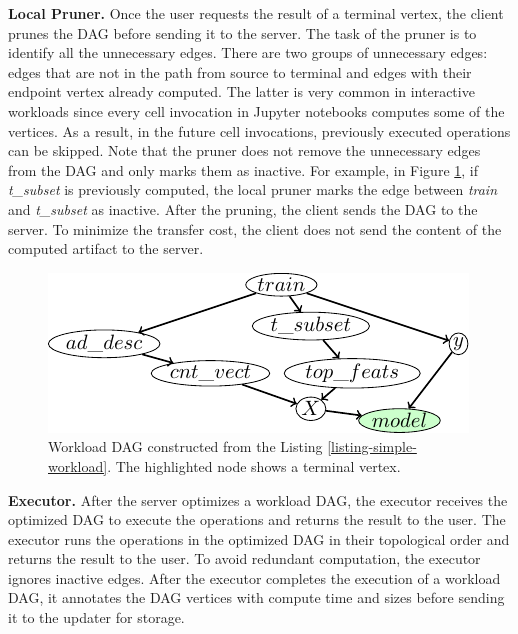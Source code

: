 \textbf{Local Pruner.}
Once the user requests the result of a terminal vertex, the client prunes the DAG before sending it to the server.
The task of the pruner is to identify all the unnecessary edges.
There are two groups of unnecessary edges: edges that are not in the path from source to terminal and edges with their endpoint vertex already computed.
The latter is very common in interactive workloads since every cell invocation in Jupyter notebooks computes some of the vertices.
As a result, in the future cell invocations, previously executed operations can be skipped.
Note that the pruner does not remove the unnecessary edges from the DAG and only marks them as inactive.
For example, in Figure \ref{fig-workload-dag}, if \textit{t\_subset} is previously computed, the local pruner marks the edge between \textit{train} and \textit{t\_subset} as inactive.
After the pruning, the client sends the DAG to the server.
To minimize the transfer cost, the client does not send the content of the computed artifact to the server.
\begin{figure}[h]
\centering
\includegraphics[width=\linewidth]{../images/tikz-standalone/example-graph}
\caption{Workload DAG constructed from the Listing \ref{listing-simple-workload}. The highlighted node shows a terminal vertex.}
\label{fig-workload-dag}
\end{figure}
\vspace{-2mm}

\textbf{Executor.}
After the server optimizes a workload DAG, the executor receives the optimized DAG to execute the operations and returns the result to the user.
The executor runs the operations in the optimized DAG in their topological order and returns the result to the user.
To avoid redundant computation, the executor ignores inactive edges.
After the executor completes the execution of a workload DAG, it annotates the DAG vertices with compute time and sizes before sending it to the updater for storage.
